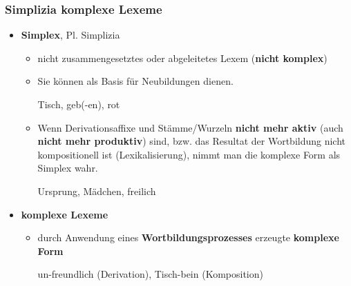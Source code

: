 \begin{frame}
\frametitle{Simplizia \vs komplexe Lexeme}

\begin{itemize}
	\item \textbf{Simplex}, Pl. Simplizia \citep[vgl.][]{Eins16b}
	
	\begin{itemize}
		\item nicht zusammengesetztes oder abgeleitetes Lexem (\textbf{nicht komplex})
		\item Sie können als Basis für Neubildungen dienen.
		
		\ea Tisch, geb(-en), rot
		\z 
		
		\item Wenn Derivationsaffixe und Stämme/Wurzeln \textbf{nicht mehr aktiv} (auch \textbf{nicht mehr produktiv}) sind, bzw. das Resultat der Wortbildung nicht kompositionell ist (Lexikalisierung), nimmt man die komplexe Form als Simplex wahr.

		\ea Ursprung, Mädchen, freilich
		\z 
	\end{itemize}

\pause 

	\item \textbf{komplexe Lexeme}
	
	\begin{itemize}
		\item durch Anwendung eines \textbf{Wortbildungsprozesses} erzeugte \textbf{komplexe Form}
		
		\ea un-freundlich (Derivation), Tisch-bein (Komposition)
		\z 
	\end{itemize}
\end{itemize}

\end{frame}


